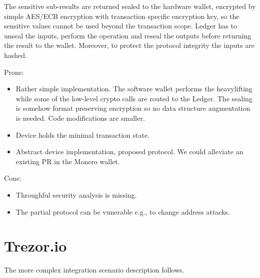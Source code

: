 \documentclass[]{article}
\begin{document}
The sensitive sub-results are returned sealed to the hardware wallet, encrypted by simple AES/ECB encryption with transaction specific encryption key, so the sensitive values cannot be used beyond the transaction scope. Ledger has to unseal the inputs, perform the operation and reseal the outputs before returning the result to the wallet. Moreover, to protect the protocol integrity the inputs are hashed. 

\;
\noindent Prons:
\begin{itemize}
	\item Rather simple implementation. The software wallet performs the heavylifting while some of the 
	low-level crypto calls are routed to the Ledger. The sealing is somehow format preserving encryption so no data structure augmentation is needed. Code modifications are smaller.
	\item Device holds the minimal transaction state.
	\item Abstract device implementation, proposed protocol. We could alleviate an existing PR\cite{ledger_pr} in the Monero wallet.
\end{itemize}

\noindent Cons:
\begin{itemize}
	\item Throughful security analysis is missing. 
	\item The partial protocol can be vunerable e.g., to change address attacks.
\end{itemize}

\noindent 

\section{Trezor.io}

The more complex integration scenario description follows.


{}

\end{document}
